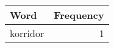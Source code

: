 \begin{tabular}{lr}
\toprule
Word & Frequency \\
\midrule
korridor & 1 \\
\bottomrule
\end{tabular}
